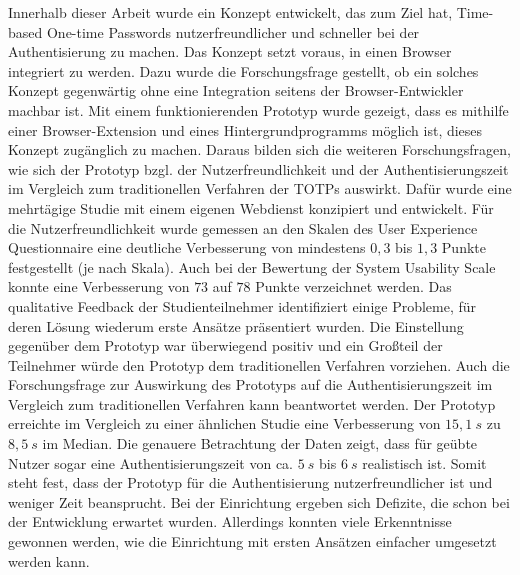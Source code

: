 Innerhalb dieser Arbeit wurde ein Konzept entwickelt, das zum Ziel hat, 
Time-based One-time Passwords nutzerfreundlicher und schneller bei der 
Authentisierung zu machen. Das Konzept setzt voraus, in einen Browser integriert 
zu werden. Dazu wurde die Forschungsfrage gestellt, ob ein solches Konzept 
gegenwärtig ohne eine Integration seitens der Browser-Entwickler machbar ist. 
Mit einem funktionierenden Prototyp wurde gezeigt, dass es mithilfe einer 
Browser-Extension und eines Hintergrundprogramms möglich ist, dieses Konzept 
zugänglich zu machen.
Daraus bilden sich die weiteren Forschungsfragen, wie sich der Prototyp bzgl. 
der Nutzerfreundlichkeit und der Authentisierungszeit im Vergleich zum 
traditionellen Verfahren der TOTPs auswirkt. Dafür wurde eine mehrtägige Studie 
mit einem eigenen Webdienst konzipiert und entwickelt. Für die 
Nutzerfreundlichkeit wurde gemessen an den Skalen des User Experience 
Questionnaire eine deutliche Verbesserung von mindestens $0{,}3$ bis $1{,}3$ 
Punkte festgestellt (je nach Skala). Auch bei der Bewertung der System Usability 
Scale konnte eine Verbesserung von $73$ auf $78$ Punkte verzeichnet werden. Das 
qualitative Feedback der Studienteilnehmer identifiziert einige Probleme, für deren Lösung 
wiederum erste Ansätze präsentiert wurden. Die Einstellung gegenüber dem 
Prototyp war überwiegend positiv und ein Großteil der Teilnehmer würde den 
Prototyp dem traditionellen Verfahren vorziehen. Auch die Forschungsfrage zur 
Auswirkung des Prototyps auf die Authentisierungszeit im Vergleich zum 
traditionellen Verfahren kann beantwortet werden. Der Prototyp erreichte im 
Vergleich zu einer ähnlichen Studie eine Verbesserung von $15{,}1~s$ zu $8{,}
5~s$ im Median. Die genauere Betrachtung der Daten zeigt, dass für geübte Nutzer 
sogar eine Authentisierungszeit von ca. $5~s$ bis $6~s$ realistisch ist. Somit 
steht fest, dass der Prototyp für die Authentisierung nutzerfreundlicher ist und 
weniger Zeit beansprucht. Bei der Einrichtung ergeben sich Defizite, die schon 
bei der Entwicklung erwartet wurden. Allerdings konnten viele Erkenntnisse 
gewonnen werden, wie die Einrichtung mit ersten Ansätzen einfacher umgesetzt werden kann.